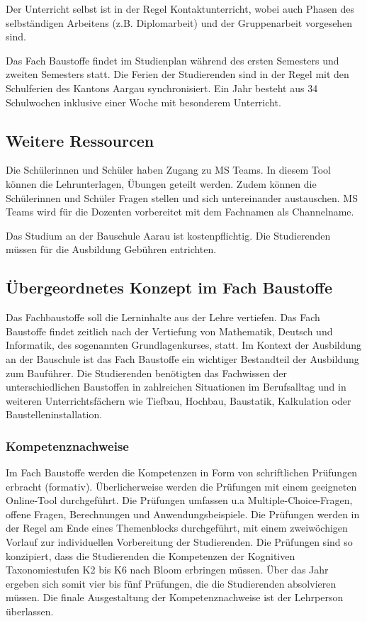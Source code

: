 \documentclass[
11pt,
captions=tableheading,
smallheadings,
headsepline,
footsepline, 
captions=tableheading,
parskip=half-,
]{scrartcl}
\begin{document}
Der Unterricht selbst ist in der Regel Kontaktunterricht, wobei auch Phasen des selbständigen Arbeitens (z.B. Diplomarbeit) und der Gruppenarbeit vorgesehen sind.

Das Fach Baustoffe findet im Studienplan während des ersten Semesters  und zweiten Semesters statt.
Die Ferien der Studierenden sind in der Regel mit den Schulferien des Kantons Aargau synchronisiert. Ein Jahr besteht aus 34 Schulwochen inklusive einer Woche mit besonderem Unterricht.

\subsection{Weitere Ressourcen}
Die Schülerinnen und Schüler haben Zugang zu MS Teams. In diesem Tool können die Lehrunterlagen, Übungen geteilt werden. Zudem können die Schülerinnen und Schüler Fragen stellen und sich untereinander austauschen. MS Teams wird für die Dozenten vorbereitet mit dem Fachnamen als Channelname.

Das Studium an der Bauschule Aarau ist kostenpflichtig. Die Studierenden müssen für die Ausbildung Gebühren entrichten.




\subsection{Übergeordnetes Konzept im Fach Baustoffe}
Das Fachbaustoffe soll die Lerninhalte aus der Lehre vertiefen.
Das Fach Baustoffe findet zeitlich  nach der Vertiefung von Mathematik, Deutsch und Informatik, des sogenannten Grundlagenkurses, statt.
Im Kontext der Ausbildung an der Bauschule ist das Fach Baustoffe ein wichtiger Bestandteil der Ausbildung zum Bauführer. 
Die Studierenden benötigten das Fachwissen der unterschiedlichen Baustoffen in zahlreichen Situationen im Berufsalltag und in weiteren Unterrichtsfächern wie Tiefbau, Hochbau, Baustatik, Kalkulation oder Baustelleninstallation.



\subsubsection{Kompetenznachweise}

Im Fach Baustoffe werden die Kompetenzen in Form von schriftlichen Prüfungen erbracht (formativ). 
Überlicherweise werden die Prüfungen mit einem geeigneten Online-Tool durchgeführt.
Die Prüfungen umfassen u.a Multiple-Choice-Fragen, offene Fragen, Berechnungen und Anwendungsbeispiele.
Die Prüfungen werden in der Regel am Ende eines Themenblocks durchgeführt, mit einem zweiwöchigen Vorlauf zur individuellen Vorbereitung der Studierenden. 
Die Prüfungen sind so konzipiert, dass die Studierenden die Kompetenzen der Kognitiven Taxonomiestufen K2 bis K6 nach Bloom erbringen müssen.
Über das Jahr ergeben sich somit vier bis fünf Prüfungen, die die Studierenden absolvieren müssen.
Die finale Ausgestaltung der Kompetenznachweise ist der Lehrperson überlassen.
\end{document}
